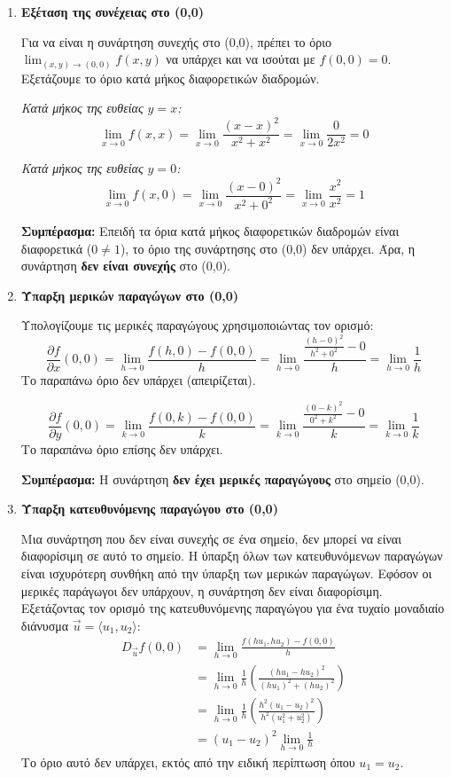 \documentclass[a4paper,12pt,twoside]{article}
\begin{document}
\begin{enumerate}[label=\roman*.]
    \item \textbf{Εξέταση της συνέχειας στο (0,0)}
    
    \noindent
    Για να είναι η συνάρτηση συνεχής στο (0,0), πρέπει το όριο $\lim_{(x,y) \to (0,0)} f(x, y)$ να υπάρχει και να ισούται με $f(0,0)=0$. Εξετάζουμε το όριο κατά μήκος διαφορετικών διαδρομών.
    
    \noindent
    \textit{Κατά μήκος της ευθείας $y=x$:}
    \[
    \lim_{x \to 0} f(x, x) = \lim_{x \to 0} \frac{(x-x)^2}{x^2 + x^2} = \lim_{x \to 0} \frac{0}{2x^2} = 0
    \]
    
    \noindent
    \textit{Κατά μήκος της ευθείας $y=0$:}
    \[
    \lim_{x \to 0} f(x, 0) = \lim_{x \to 0} \frac{(x-0)^2}{x^2 + 0^2} = \lim_{x \to 0} \frac{x^2}{x^2} = 1
    \]
    
    \noindent
    \textbf{Συμπέρασμα:} Επειδή τα όρια κατά μήκος διαφορετικών διαδρομών είναι διαφορετικά ($0 \neq 1$), το όριο της συνάρτησης στο (0,0) δεν υπάρχει. Άρα, η συνάρτηση \textbf{δεν είναι συνεχής} στο (0,0).

    \item \textbf{Ύπαρξη μερικών παραγώγων στο (0,0)}
    
    \noindent
    Υπολογίζουμε τις μερικές παραγώγους χρησιμοποιώντας τον ορισμό:
    \[
    \frac{\partial f}{\partial x}(0,0) = \lim_{h \to 0} \frac{f(h, 0) - f(0,0)}{h} = \lim_{h \to 0} \frac{\frac{(h-0)^2}{h^2+0^2} - 0}{h} = \lim_{h \to 0} \frac{1}{h}
    \]
    Το παραπάνω όριο δεν υπάρχει (απειρίζεται).
    
    \[
    \frac{\partial f}{\partial y}(0,0) = \lim_{k \to 0} \frac{f(0, k) - f(0,0)}{k} = \lim_{k \to 0} \frac{\frac{(0-k)^2}{0^2+k^2} - 0}{k} = \lim_{k \to 0} \frac{1}{k}
    \]
    Το παραπάνω όριο επίσης δεν υπάρχει.
    
    \noindent
    \textbf{Συμπέρασμα:} Η συνάρτηση \textbf{δεν έχει μερικές παραγώγους} στο σημείο (0,0).

    \item \textbf{Ύπαρξη κατευθυνόμενης παραγώγου στο (0,0)}
    
    \noindent
    Μια συνάρτηση που δεν είναι συνεχής σε ένα σημείο, δεν μπορεί να είναι διαφορίσιμη σε αυτό το σημείο. Η ύπαρξη όλων των κατευθυνόμενων παραγώγων είναι ισχυρότερη συνθήκη από την ύπαρξη των μερικών παραγώγων. Εφόσον οι μερικές παράγωγοι δεν υπάρχουν, η συνάρτηση δεν είναι διαφορίσιμη. Εξετάζοντας τον ορισμό της κατευθυνόμενης παραγώγου για ένα τυχαίο μοναδιαίο διάνυσμα $\vec{u} = \langle u_1, u_2 \rangle$:
    \begin{align*}
    D_{\vec{u}}f(0,0) &= \lim_{h \to 0} \frac{f(hu_1, hu_2) - f(0,0)}{h} \\
    &= \lim_{h \to 0} \frac{1}{h} \left( \frac{(hu_1 - hu_2)^2}{(hu_1)^2 + (hu_2)^2} \right) \\
    &= \lim_{h \to 0} \frac{1}{h} \left( \frac{h^2(u_1 - u_2)^2}{h^2(u_1^2 + u_2^2)} \right) \\
    &= (u_1 - u_2)^2 \lim_{h \to 0} \frac{1}{h}
    \end{align*}
    Το όριο αυτό δεν υπάρχει, εκτός από την ειδική περίπτωση όπου $u_1 = u_2$.
    

\end{enumerate}
\end{document}
